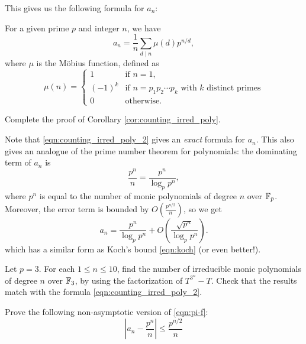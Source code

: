 This gives us the following formula for $a_n$:
\begin{corollary}
    \label{cor:counting_irred_poly}
    For a given prime $p$ and integer $n$, we have
    \begin{equation}
        a_n = \frac{1}{n} \sum_{d \mid n} \mu(d) p^{n/d},
        \label{eqn:counting_irred_poly_2}
    \end{equation}
    where $\mu$ is the M\"obius function, defined as
    \begin{equation}
        \mu(n) = \begin{cases}
            1 & \text{if } n = 1,\\
            (-1)^k & \text{if } n = p_1 p_2 \cdots p_k \text{ with } k \text{ distinct primes} \\
            0 & \text{otherwise.}
        \end{cases}
    \label{eqn:mobius}
    \end{equation}
\end{corollary}

\begin{exercise}
    Complete the proof of Corollary \ref{cor:counting_irred_poly}.
\end{exercise}

Note that \eqref{eqn:counting_irred_poly_2} gives an \emph{exact} formula for $a_n$.
This also gives an analogue of the prime number theorem for polynomials: the dominating term of $a_n$ is
\[
\frac{p^n}{n} = \frac{p^n}{\log_p p^n},
\]
where $p^n$ is equal to the number of monic polynomials of degree $n$ over $\mathbb{F}_p$.
Moreover, the error term is bounded by $O\left(\frac{p^{n/2}}{n}\right)$, so we get
\begin{equation}
    a_n = \frac{p^n}{\log_p p^n} + O\left(\frac{\sqrt{p^n}}{\log_p p^n}\right).
    \label{eqn:pi-f}
\end{equation}
which has a similar form as Koch's bound \eqref{eqn:koch} (or even better!).

\begin{exercise}\sage
    Let $p = 3$. For each $1 \le n \le 10$, find the number of irreducible monic polynomials of degree $n$ over $\mathbb{F}_3$, by using the factorization of $T^{3^n} - T$.
    Check that the results match with the formula \eqref{eqn:counting_irred_poly_2}.
\end{exercise}

\begin{exercise}
    Prove the following non-asymptotic version of \eqref{eqn:pi-f}:
    \[
    \left|a_n - \frac{p^n}{n} \right| \le \frac{p^{n/2}}{n}
    \]
\end{exercise}

